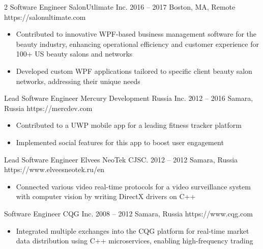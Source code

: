 \documentclass[9pt,a4paper]{igrmkcv}
\begin{document}
\begin{paracol}{2}
    \cvLeftEvent
        {Software Engineer}
        {SalonUtlimate Inc.}
        {2016 -- 2017}
        {Boston, MA, Remote}
        {https://salonultimate.com}

        \begin{itemize}
            \item Contributed to innovative WPF-based business management software for the beauty industry,
                  enhancing operational efficiency and customer experience for 100+ US beauty salons and networks
            \item Developed custom WPF applications tailored to specific client beauty salon networks,
                  addressing their unique needs
        \end{itemize}

    \cvLeftEvent
        {Lead Software Engineer}
        {Mercury Development Russia Inc.}
        {2012 -- 2016}
        {Samara, Russia}
        {https://mercdev.com}

        \begin{itemize}
            \item Contributed to a UWP mobile app for a leading fitness tracker platform
            \item Implemented social features for this app to boost user engagement
        \end{itemize}

    \cvLeftEvent
        {Lead Software Engineer}
        {Elvees NeoTek CJSC.}
        {2012 -- 2012}
        {Samara, Russia}
        {https://www.elveesneotek.ru/en}

        \begin{itemize}
            \item Connected various video real-time protocols for
                  a video surveillance system with computer vision
                  by writing DirectX drivers on C++
        \end{itemize}

    \cvLeftEvent
        {Software Engineer}
        {CQG Inc.}
        {2008 -- 2012}
        {Samara, Russia}
        {https://www.cqg.com}

        \begin{itemize}
            \item Integrated multiple exchanges into the CQG platform for real-time market data distribution
                  using C++ microservices, enabling high-frequency trading
        \end{itemize}


\end{paracol}
\end{document}
